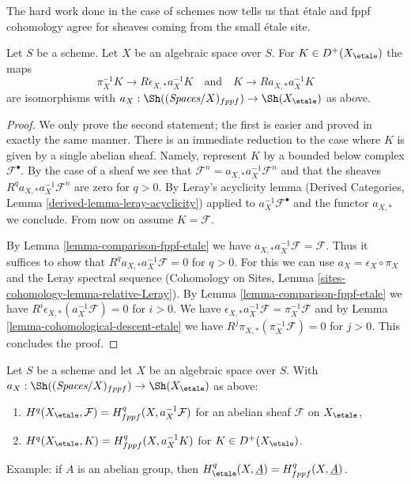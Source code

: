 \noindent
The hard work done in the case of schemes now tells us that
\'etale and fppf cohomology agree for sheaves coming from the
small \'etale site.

\begin{lemma}
\label{lemma-cohomological-descent-etale-fppf}
Let $S$ be a scheme. Let $X$ be an algebraic space over $S$.
For $K \in D^+(X_\etale)$ the maps
$$
\pi_X^{-1}K \longrightarrow R\epsilon_{X, *}a_X^{-1}K
\quad\text{and}\quad
K \longrightarrow Ra_{X, *}a_X^{-1}K
$$
are isomorphisms with
$a_X : \Sh((\textit{Spaces}/X)_{fppf}) \to \Sh(X_\etale)$ as above.
\end{lemma}

\begin{proof}
We only prove the second statement; the first is easier and proved in exactly
the same manner.
There is an immediate reduction to the case where
$K$ is given by a single abelian sheaf. Namely, represent $K$
by a bounded below complex $\mathcal{F}^\bullet$. By the case of a
sheaf we see that
$\mathcal{F}^n = a_{X, *} a_X^{-1} \mathcal{F}^n$
and that the sheaves $R^qa_{X, *}a_X^{-1}\mathcal{F}^n$
are zero for $q > 0$. By Leray's acyclicity lemma
(Derived Categories, Lemma \ref{derived-lemma-leray-acyclicity})
applied to $a_X^{-1}\mathcal{F}^\bullet$
and the functor $a_{X, *}$ we conclude. From now on assume $K = \mathcal{F}$.

\medskip\noindent
By Lemma \ref{lemma-comparison-fppf-etale} we have
$a_{X, *}a_X^{-1}\mathcal{F} = \mathcal{F}$. Thus it suffices to show that
$R^qa_{X, *}a_X^{-1}\mathcal{F} = 0$ for $q > 0$.
For this we can use $a_X = \epsilon_X \circ \pi_X$ and
the Leray spectral sequence
(Cohomology on Sites, Lemma \ref{sites-cohomology-lemma-relative-Leray}).
By Lemma \ref{lemma-comparison-fppf-etale}
we have $R^i\epsilon_{X, *}(a_X^{-1}\mathcal{F}) = 0$ for $i > 0$.
We have
$\epsilon_{X, *}a_X^{-1}\mathcal{F} = \pi_X^{-1}\mathcal{F}$
and by Lemma \ref{lemma-cohomological-descent-etale} we have
$R^j\pi_{X, *}(\pi_X^{-1}\mathcal{F}) = 0$ for $j > 0$.
This concludes the proof.
\end{proof}

\begin{lemma}
\label{lemma-compare-cohomology-etale-fppf}
Let $S$ be a scheme and let $X$ be an algebraic space over $S$.
With $a_X : \Sh((\textit{Spaces}/X)_{fppf}) \to \Sh(X_\etale)$
as above:
\begin{enumerate}
\item $H^q(X_\etale, \mathcal{F}) = H^q_{fppf}(X, a_X^{-1}\mathcal{F})$
for an abelian sheaf $\mathcal{F}$ on $X_\etale$,
\item $H^q(X_\etale, K) = H^q_{fppf}(X, a_X^{-1}K)$ for $K \in D^+(X_\etale)$.
\end{enumerate}
Example: if $A$ is an abelian group, then
$H^q_\etale(X, \underline{A}) = H^q_{fppf}(X, \underline{A})$.
\end{lemma}

